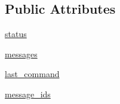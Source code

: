 \subsection*{Public Attributes}
\begin{DoxyCompactItemize}
\item 
\hyperlink{classparlai_1_1mturk_1_1core_1_1legacy__2018_1_1agents_1_1AssignState_a256124e49cab161d21001e45e26a391a}{status}
\item 
\hyperlink{classparlai_1_1mturk_1_1core_1_1legacy__2018_1_1agents_1_1AssignState_a41427f6194d8c173f415b119596b479c}{messages}
\item 
\hyperlink{classparlai_1_1mturk_1_1core_1_1legacy__2018_1_1agents_1_1AssignState_a6b14225b614a29376d4d92ba03069780}{last\+\_\+command}
\item 
\hyperlink{classparlai_1_1mturk_1_1core_1_1legacy__2018_1_1agents_1_1AssignState_a00bad7002a4cb6fad145d9b0f79b0ae3}{message\+\_\+ids}
\end{DoxyCompactItemize}
